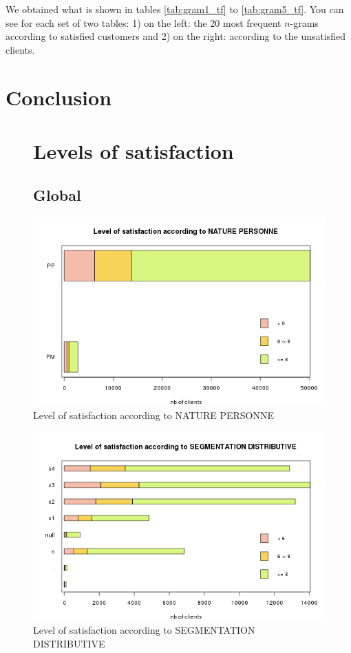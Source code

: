 \documentclass[a4paper, 11pt]{article}
\begin{document}
    We obtained what is shown in tables \ref{tab:gram1_tf} to \ref{tab:gram5_tf}. You can see for each set of two tables: 1) on the left: the 20 most frequent $n$-grams according to satisfied customers and 2) on the right: according to the unsatisfied clients.

     
\section{Conclusion}
\label{sec:ccl}


\newpage
\appendix
    \begin{figure}[!ht]
    \section{Levels of satisfaction}
    \label{app:satisfaction}
    	\subsection{Global}
    	\centering
            \includegraphics[width = 10 cm]{Remi/Level_of_satisfaction_according_to_NATURE_PERSONNE.png}
            \caption{Level of satisfaction according to NATURE PERSONNE}
            \label{fig:NATURE_PERSONNE}
    \end{figure}
    
    \begin{figure}[!ht]
    	\centering
            \includegraphics[height = 10 cm]{Remi/Level_of_satisfaction_according_to_SEGMENTATION_DISTRIBUTIVE.png}
            \caption{Level of satisfaction according to SEGMENTATION DISTRIBUTIVE}
            \label{fig:SEGMENTATION_DISTRIBUTIVE}
    \end{figure}
    
\end{document}
